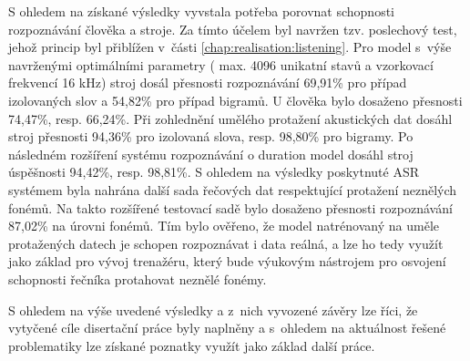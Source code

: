 S ohledem na získané výsledky vyvstala potřeba porovnat schopnosti rozpoznávání člověka a stroje. Za tímto účelem byl navržen tzv. poslechový test, jehož princip byl přiblížen v~části \ref{chap:realisation:listening}. Pro model s~výše navrženými optimálními parametry ( max. 4096 unikatní stavů a vzorkovací frekvencí 16 kHz) stroj dosál přesnosti rozpoznávání  69,91\% pro případ izolovaných slov a 54,82\% pro případ bigramů. U člověka bylo dosaženo přesnosti 74,47\%, resp. 66,24\%. Při zohlednění umělého protažení akustických dat dosáhl stroj přesnosti 94,36\% pro izolovaná slova, resp. 98,80\% pro bigramy. Po následném rozšíření systému rozpoznávání o duration model dosáhl stroj úspěšnosti 94,42\%, resp. 98,81\%. S ohledem na výsledky poskytnuté ASR systémem byla nahrána další sada řečových dat respektující protažení neznělých fonémů. Na takto rozšířené testovací sadě bylo dosaženo přesnosti rozpoznávání 87,02\% na úrovni fonémů. Tím bylo ověřeno, že model natrénovaný na uměle protažených datech je schopen rozpoznávat i data reálná, a lze ho tedy využít jako základ pro vývoj trenažéru, který bude výukovým nástrojem pro osvojení schopnosti řečníka protahovat neznělé fonémy.

S ohledem na výše uvedené výsledky a z~nich vyvozené závěry lze říci, že vytyčené cíle disertační práce byly naplněny a s~ohledem na aktuálnost řešené problematiky lze získané poznatky využít jako základ další práce.










